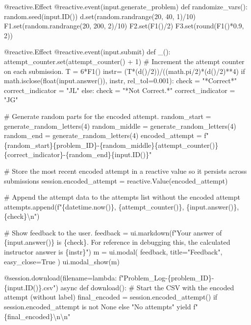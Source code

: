 \documentclass[
  letterpaper,
  DIV=11,
  numbers=noendperiod]{scrreprt}
\newenvironment{Shaded}{\begin{snugshade}}{\end{snugshade}}
\newcommand{\NormalTok}[1]{\textcolor[rgb]{0.00,0.23,0.31}{#1}}
\begin{document}
\begin{Shaded}
\begin{Highlighting}[]
\NormalTok{    @reactive.Effect}
\NormalTok{    @reactive.event(input.generate\_problem)}
\NormalTok{    def randomize\_vars():}
\NormalTok{        random.seed(input.ID())}
\NormalTok{        d.set(random.randrange(20, 40, 1)/10)}
\NormalTok{        F1.set(random.randrange(20, 200, 2)/10)}
\NormalTok{        F2.set(F1()/2)}
\NormalTok{        F3.set(round(F1()*0.9, 2))}
        
        
\NormalTok{    @reactive.Effect}
\NormalTok{    @reactive.event(input.submit)}
\NormalTok{    def \_():}
\NormalTok{        attempt\_counter.set(attempt\_counter() + 1)  \# Increment the attempt counter on each submission.}
\NormalTok{        T = 6*F1()}
\NormalTok{        instr= (T*(d()/2))/((math.pi/2)*(d()/2)**4)}
\NormalTok{        if math.isclose(float(input.answer()), instr, rel\_tol=0.001):}
\NormalTok{            check = "*Correct*"}
\NormalTok{            correct\_indicator = "JL"}
\NormalTok{        else:}
\NormalTok{            check = "*Not Correct.*"}
\NormalTok{            correct\_indicator = "JG"}

\NormalTok{        \# Generate random parts for the encoded attempt.}
\NormalTok{        random\_start = generate\_random\_letters(4)}
\NormalTok{        random\_middle = generate\_random\_letters(4)}
\NormalTok{        random\_end = generate\_random\_letters(4)}
\NormalTok{        encoded\_attempt = f"\{random\_start\}\{problem\_ID\}{-}\{random\_middle\}\{attempt\_counter()\}\{correct\_indicator\}{-}\{random\_end\}\{input.ID()\}"}

\NormalTok{        \# Store the most recent encoded attempt in a reactive value so it persists across submissions}
\NormalTok{        session.encoded\_attempt = reactive.Value(encoded\_attempt)}

\NormalTok{        \# Append the attempt data to the attempts list without the encoded attempt}
\NormalTok{        attempts.append(f"\{datetime.now()\}, \{attempt\_counter()\}, \{input.answer()\}, \{check\}\textbackslash{}n")}

\NormalTok{        \# Show feedback to the user.}
\NormalTok{        feedback = ui.markdown(f"Your answer of \{input.answer()\} is \{check\}. For reference in debugging this, the calculated instructor answer is \{instr\}")}
\NormalTok{        m = ui.modal(}
\NormalTok{            feedback,}
\NormalTok{            title="Feedback",}
\NormalTok{            easy\_close=True}
\NormalTok{        )}
\NormalTok{        ui.modal\_show(m)}

\NormalTok{    @session.download(filename=lambda: f"Problem\_Log{-}\{problem\_ID\}{-}\{input.ID()\}.csv")}
\NormalTok{    async def download():}
\NormalTok{        \# Start the CSV with the encoded attempt (without label)}
\NormalTok{        final\_encoded = session.encoded\_attempt() if session.encoded\_attempt is not None else "No attempts"}
\NormalTok{        yield f"\{final\_encoded\}\textbackslash{}n\textbackslash{}n"}
        

\end{Highlighting}
\end{Shaded}
\end{document}
